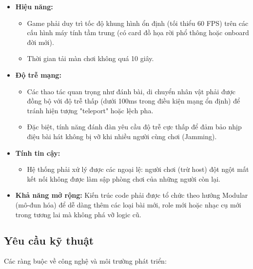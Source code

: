 \begin{itemize}
    \item \textbf{Hiệu năng:}
        \begin{itemize}
            \item Game phải duy trì tốc độ khung hình ổn định (tối thiểu 60 FPS) trên các cấu hình máy tính tầm trung (có card đồ họa rời phổ thông hoặc onboard đời mới).
            \item Thời gian tải màn chơi không quá 10 giây.
        \end{itemize}
    \item \textbf{Độ trễ mạng:}
        \begin{itemize}
            \item Các thao tác quan trọng như đánh bài, di chuyển nhân vật phải được đồng bộ với độ trễ thấp (dưới 100ms trong điều kiện mạng ổn định) để tránh hiện tượng "teleport" hoặc lệch pha.
            \item Đặc biệt, tính năng đánh đàn yêu cầu độ trễ cực thấp để đảm bảo nhịp điệu bài hát không bị vỡ khi nhiều người cùng chơi (Jamming).
        \end{itemize}
    \item \textbf{Tính tin cậy:}
        \begin{itemize}
            \item Hệ thống phải xử lý được các ngoại lệ: người chơi (trừ host) đột ngột mất kết nối không được làm sập phòng chơi của những người còn lại.
        \end{itemize}
    \item \textbf{Khả năng mở rộng:} Kiến trúc code phải được tổ chức theo hướng Modular (mô-đun hóa) để dễ dàng thêm các loại bài mới, role mới hoặc nhạc cụ mới trong tương lai mà không phá vỡ logic cũ.
\end{itemize}

\subsection{Yêu cầu kỹ thuật}
Các ràng buộc về công nghệ và môi trường phát triển:

